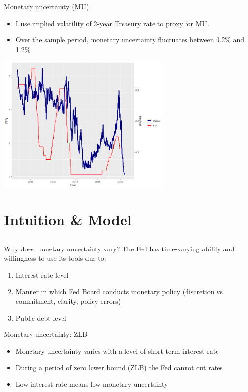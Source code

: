 \documentclass{beamer}
\begin{document}
\begin{frame}{Monetary uncertainty (MU)}
\begin{itemize}
    \item {I use implied volatility of 2-year Treasury rate to proxy for MU.}
    \item {Over the sample period, monetary uncertainty fluctuates between 0.2\% and 1.2\%.}
\end{itemize}
\centering
\includegraphics[width=0.64\textwidth]{images/imvol_ffr_plot.png}
\end{frame}



\section{Intuition \& Model}
\subsection{}

\begin{frame}{Why does monetary uncertainty vary?}
The Fed has time-varying ability and willingness to use its tools due to:
\begin{enumerate}
    \item Interest rate level
    \item Manner in which Fed Board conducts monetary policy (discretion vs commitment, clarity, policy errors)
    \item Public debt level
\end{enumerate}
\end{frame}



\begin{frame}{Monetary uncertainty: ZLB}
    \begin{itemize}
        \item Monetary uncertainty varies with a level of short-term interest rate
        \item During a period of zero lower bound (ZLB) the Fed cannot cut rates
        \item Low interest rate means low monetary uncertainty
    \end{itemize}  
\end{frame}
\end{document}
